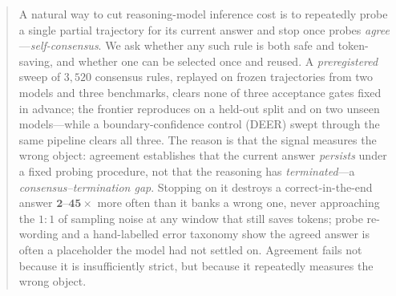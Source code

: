 \begin{abstract}
A natural way to cut reasoning-model inference cost is to repeatedly probe a
single partial trajectory for its current answer and stop once probes
\emph{agree}---\emph{self-consensus}. We ask whether any such rule is both safe
and token-saving, and whether one can be selected once and reused. A
\emph{preregistered} sweep of $3{,}520$ consensus rules, replayed on frozen
trajectories from two models and three benchmarks, clears none of three
acceptance gates fixed in advance; the frontier reproduces on a held-out split
and on two unseen models---while a boundary-confidence control
(DEER) swept through the same pipeline clears all three. The reason is
that the signal measures the wrong object: agreement establishes that the
current answer \emph{persists} under a fixed probing procedure, not that the
reasoning has \emph{terminated}---a \emph{consensus--termination gap}. Stopping
on it destroys a correct-in-the-end answer $\mathbf{2}$--$\mathbf{45\times}$
more often than it banks a wrong one, never approaching the $1{:}1$ of sampling
noise at any window that still saves tokens; probe re-wording and a
hand-labelled error taxonomy show the agreed answer is often a
placeholder the model had not settled on. Agreement fails not because it is
insufficiently strict, but because it repeatedly measures the wrong object.
\end{abstract}

